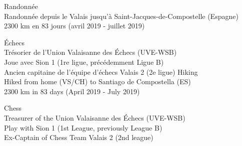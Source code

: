 \ifFrench
  \normalsize
  \color{deepgray}
  Randonnée \\
  \color{mediumgray} \small
  Randonnée depuis le Valais jusqu'à Saint-Jacques-de-Compostelle (Espagne) \\
  2300 km en 83 jours (avril 2019 - juillet 2019)
  \vspace{3mm}

  \color{deepgray}
  \normalsize
  Échecs \\
  \color{mediumgray} \small
  Trésorier de l'Union Valaisanne des Échecs (UVE-WSB) \\
  Joue avec Sion 1 (1re ligue, précédemment Ligue B) \\
  Ancien capitaine de l'équipe d'échecs Valais 2 (2e ligue)
\else
  \normalsize
  \color{deepgray}
  Hiking \\
  \color{mediumgray} \small
  Hiked from home (VS/CH) to Santiago de Compostella (ES) \\
  2300 km in 83 days (April 2019 - July 2019)
  \vspace{3mm}

  \color{deepgray}
  \normalsize
  Chess \\
  \color{mediumgray} \small
  Treasurer of the Union Valaisanne des Échecs (UVE-WSB) \\
  Play with Sion 1 (1st League, previously League B) \\
  Ex-Captain of Chess Team Valais 2 (2nd league)
\fi
